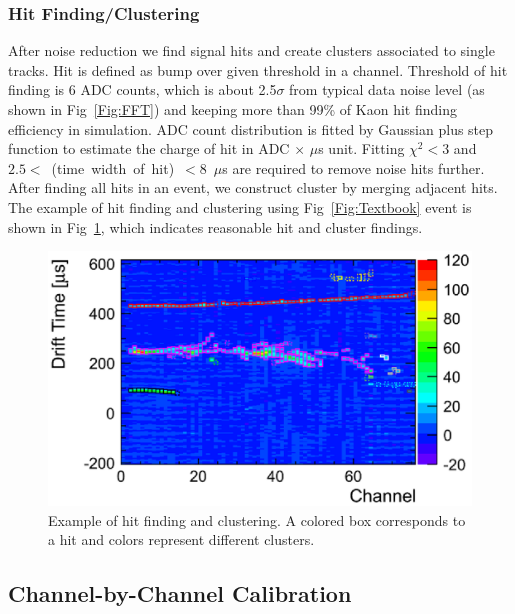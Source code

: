 \subsubsection{Hit Finding/Clustering}
After noise reduction we find signal hits and create clusters associated to single tracks. 
Hit is defined as bump over given threshold in a channel. 
Threshold of hit finding is 6 ADC counts, which is about 2.5$\sigma$ from typical data noise level (as shown in Fig~\ref{Fig:FFT}) and keeping more than 99\% of Kaon hit finding efficiency in simulation.
ADC count distribution is fitted by Gaussian plus step function to estimate the charge of hit in ADC $\times$ $\mu$s unit.
Fitting $\chi^2 < 3$ and $2.5<$~(time~width~of~hit)~$<8$~$\mu$s are required to remove noise hits further.
After finding all hits in an event, we construct cluster by merging adjacent hits. 
The example of hit finding and clustering using Fig~\ref{Fig:Textbook} event is shown in Fig~\ref{fig:Clustering}, which indicates reasonable hit and cluster findings. 

\begin{figure}[htbp]
 \begin{center}
  \includegraphics[width=1.0\hsize]{fig/clustering.eps}
 \end{center}
 \caption{Example of hit finding and clustering. A colored box corresponds to a hit and colors represent different clusters.}
 \label{fig:Clustering}
\end{figure}


\subsection{Channel-by-Channel Calibration}

